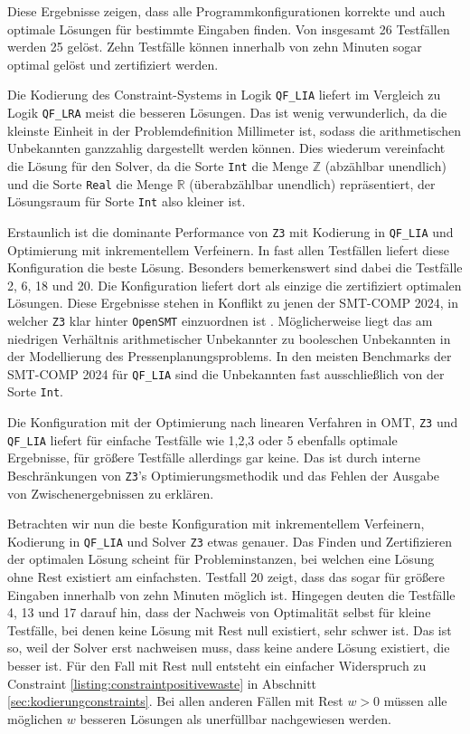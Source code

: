 Diese Ergebnisse zeigen, dass alle Programmkonfigurationen korrekte und auch optimale Lösungen für bestimmte Eingaben finden.
Von insgesamt 26 Testfällen werden 25 gelöst.
Zehn Testfälle können innerhalb von zehn Minuten sogar optimal gelöst und zertifiziert werden.

Die Kodierung des Constraint-Systems in Logik \texttt{QF\_LIA} liefert im Vergleich zu Logik \texttt{QF\_LRA} meist die besseren Lösungen.
Das ist wenig verwunderlich, da die kleinste Einheit in der Problemdefinition Millimeter ist, sodass die arithmetischen Unbekannten ganzzahlig dargestellt werden können.
Dies wiederum vereinfacht die Lösung für den Solver, da die Sorte \texttt{Int} die Menge $\mathbb{Z}$ (abzählbar unendlich) und
die Sorte \texttt{Real} die Menge $\mathbb{R}$ (überabzählbar unendlich) repräsentiert, der Lösungsraum für Sorte \texttt{Int} also kleiner ist.

Erstaunlich ist die dominante Performance von \texttt{Z3} mit Kodierung in \texttt{QF\_LIA} und Optimierung mit inkrementellem Verfeinern.
In fast allen Testfällen liefert diese Konfiguration die beste Lösung.
Besonders bemerkenswert sind dabei die Testfälle 2, 6, 18 und 20.
Die Konfiguration liefert dort als einzige die zertifiziert optimalen Lösungen.
Diese Ergebnisse stehen in Konflikt zu jenen der SMT-COMP 2024, in welcher \texttt{Z3} klar hinter \texttt{OpenSMT} einzuordnen ist \cite{smtcomp2024results}.
Möglicherweise liegt das am niedrigen Verhältnis arithmetischer Unbekannter zu booleschen Unbekannten in der Modellierung des Pressenplanungsproblems.
In den meisten Benchmarks der SMT-COMP 2024 für \texttt{QF\_LIA} sind die Unbekannten fast ausschließlich von der Sorte \texttt{Int}.

Die Konfiguration mit der Optimierung nach linearen Verfahren in OMT, \texttt{Z3} und \texttt{QF\_LIA}
liefert für einfache Testfälle wie 1,2,3 oder 5 ebenfalls optimale Ergebnisse, für größere Testfälle allerdings gar keine.
Das ist durch interne Beschränkungen von \texttt{Z3}'s Optimierungsmethodik und das Fehlen der Ausgabe von Zwischenergebnissen zu erklären.

Betrachten wir nun die beste Konfiguration mit inkrementellem Verfeinern, Kodierung in \texttt{QF\_LIA} und Solver \texttt{Z3} etwas genauer.
Das Finden und Zertifizieren der optimalen Lösung scheint für Probleminstanzen, bei welchen eine Lösung ohne Rest existiert am einfachsten.
Testfall 20 zeigt, dass das sogar für größere Eingaben innerhalb von zehn Minuten möglich ist.
Hingegen deuten die Testfälle 4, 13 und 17 darauf hin, dass der Nachweis von Optimalität selbst für kleine Testfälle,
bei denen keine Lösung mit Rest null existiert, sehr schwer ist.
Das ist so, weil der Solver erst nachweisen muss, dass keine andere Lösung existiert, die besser ist.
Für den Fall mit Rest null entsteht ein einfacher Widerspruch zu Constraint \ref{listing:constraintpositivewaste} in Abschnitt \ref{sec:kodierungconstraints}.
Bei allen anderen Fällen mit Rest $w > 0$ müssen alle möglichen $w$ besseren Lösungen als unerfüllbar nachgewiesen werden.


